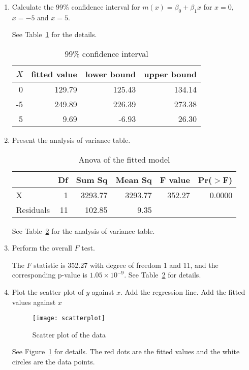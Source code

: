 \documentclass[a4paper,12pt]{article}
\begin{document}
\begin{enumerate}
\item Calculate the 99\% confidence interval for
$m(x)=\beta_0+\beta_1 x$ for $x=0$, $x=-5$ and $x=5$.
\par
See Table~\ref{tab:confidence} for the details.
\begin{table}[htbp]
  \centering
  \begin{tabular}{rrrr}
  \hline
$X$ & fitted value & lower bound & upper bound \\ 
  \hline
0 & 129.79 & 125.43 & 134.14 \\ 
 -5 & 249.89 & 226.39 & 273.38 \\ 
  5 & 9.69 & -6.93 & 26.30 \\ 
   \hline
\end{tabular}
  \caption{99\% confidence interval}
  \label{tab:confidence}
\end{table}
\par


\item Present the analysis of variance table.
\par
\begin{table}[htbp]
    \centering
    \begin{tabular}{lrrrrr}
  \hline
 & Df & Sum Sq & Mean Sq & F value & Pr($>$F) \\ 
  \hline
X & 1 & 3293.77 & 3293.77 & 352.27 & 0.0000 \\ 
  Residuals & 11 & 102.85 & 9.35 &  &  \\ 
   \hline
\end{tabular}
    \caption{Anova of the fitted model}
    \label{tab:anova}
\end{table}
\par
See Table~\ref{tab:anova} for the analysis of variance table.
\par

\item Perform the overall $F$ test.
\par
The $F$ statistic is 352.27 with degree of freedom 1 and 11, and the corresponding p-value is $1.05\times 10^{-9}$. See Table~\ref{tab:anova} for details.
\par



\item Plot the scatter plot of $y$ against $x$.
Add the regression line. Add the fitted values against $x$
\par
\begin{figure}[htbp]
  \centering
  \texttt{[image: scatterplot]}
  \caption{Scatter plot of the data}
  \label{fig:scatterplot}
\end{figure}
\par
See Figure~\ref{fig:scatterplot} for details. The red dots are the fitted values and the white circles are the data points.
\par


\end{enumerate}
\end{document}
